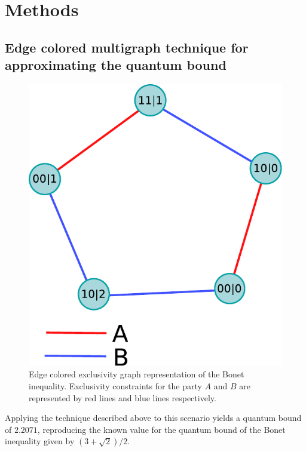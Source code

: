 \documentclass[letterpaper]{article}
\begin{document}

\section*{Methods}
\subsection*{Edge colored multigraph technique for approximating the quantum
bound}
\begin{figure}[t]
    \centering
    \includegraphics[width=.7\columnwidth]{images/instrumental_multigraph.pdf}
    \caption{Edge colored exclusivity graph representation of the Bonet
        inequality. Exclusivity constraints for the party $A$ and $B$ are
    represented by red lines and blue lines respectively.}
    \label{fig:instrumental_multigraph}
\end{figure}
Applying the technique described above to this scenario yields a quantum
bound of $2.2071$, reproducing the known value for the quantum bound of the Bonet inequality given by $(3+\sqrt{2})/2$.
\end{document}

